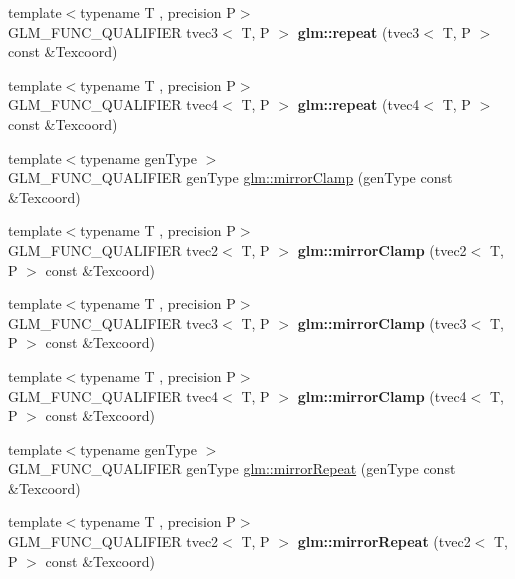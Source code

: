 \begin{DoxyCompactItemize}
\item 
\hypertarget{namespaceglm_a2f193fb57465ccc4888523a0c84c51f4}{{\footnotesize template$<$typename T , precision P$>$ }\\G\-L\-M\-\_\-\-F\-U\-N\-C\-\_\-\-Q\-U\-A\-L\-I\-F\-I\-E\-R tvec3$<$ T, P $>$ {\bfseries glm\-::repeat} (tvec3$<$ T, P $>$ const \&Texcoord)}\label{namespaceglm_a2f193fb57465ccc4888523a0c84c51f4}

\item 
\hypertarget{namespaceglm_ade6cefbc71237ce919649e93d4a9fd05}{{\footnotesize template$<$typename T , precision P$>$ }\\G\-L\-M\-\_\-\-F\-U\-N\-C\-\_\-\-Q\-U\-A\-L\-I\-F\-I\-E\-R tvec4$<$ T, P $>$ {\bfseries glm\-::repeat} (tvec4$<$ T, P $>$ const \&Texcoord)}\label{namespaceglm_ade6cefbc71237ce919649e93d4a9fd05}

\item 
{\footnotesize template$<$typename gen\-Type $>$ }\\G\-L\-M\-\_\-\-F\-U\-N\-C\-\_\-\-Q\-U\-A\-L\-I\-F\-I\-E\-R gen\-Type \hyperlink{group__gtx__wrap_gaa6856a0a048d2749252848da35e10c8b}{glm\-::mirror\-Clamp} (gen\-Type const \&Texcoord)
\item 
\hypertarget{namespaceglm_adebe151810a11d00420dbc8e645dd2f4}{{\footnotesize template$<$typename T , precision P$>$ }\\G\-L\-M\-\_\-\-F\-U\-N\-C\-\_\-\-Q\-U\-A\-L\-I\-F\-I\-E\-R tvec2$<$ T, P $>$ {\bfseries glm\-::mirror\-Clamp} (tvec2$<$ T, P $>$ const \&Texcoord)}\label{namespaceglm_adebe151810a11d00420dbc8e645dd2f4}

\item 
\hypertarget{namespaceglm_a351ab91b9a08eab89ea19fd541b1b03d}{{\footnotesize template$<$typename T , precision P$>$ }\\G\-L\-M\-\_\-\-F\-U\-N\-C\-\_\-\-Q\-U\-A\-L\-I\-F\-I\-E\-R tvec3$<$ T, P $>$ {\bfseries glm\-::mirror\-Clamp} (tvec3$<$ T, P $>$ const \&Texcoord)}\label{namespaceglm_a351ab91b9a08eab89ea19fd541b1b03d}

\item 
\hypertarget{namespaceglm_a34d59b331fd9c3f69c5921312c76da57}{{\footnotesize template$<$typename T , precision P$>$ }\\G\-L\-M\-\_\-\-F\-U\-N\-C\-\_\-\-Q\-U\-A\-L\-I\-F\-I\-E\-R tvec4$<$ T, P $>$ {\bfseries glm\-::mirror\-Clamp} (tvec4$<$ T, P $>$ const \&Texcoord)}\label{namespaceglm_a34d59b331fd9c3f69c5921312c76da57}

\item 
{\footnotesize template$<$typename gen\-Type $>$ }\\G\-L\-M\-\_\-\-F\-U\-N\-C\-\_\-\-Q\-U\-A\-L\-I\-F\-I\-E\-R gen\-Type \hyperlink{group__gtx__wrap_ga16a89b0661b60d5bea85137bbae74d73}{glm\-::mirror\-Repeat} (gen\-Type const \&Texcoord)
\item 
\hypertarget{namespaceglm_a3ef76b9b162788aafa64b1483ad74269}{{\footnotesize template$<$typename T , precision P$>$ }\\G\-L\-M\-\_\-\-F\-U\-N\-C\-\_\-\-Q\-U\-A\-L\-I\-F\-I\-E\-R tvec2$<$ T, P $>$ {\bfseries glm\-::mirror\-Repeat} (tvec2$<$ T, P $>$ const \&Texcoord)}\label{namespaceglm_a3ef76b9b162788aafa64b1483ad74269}


\end{DoxyCompactItemize}
